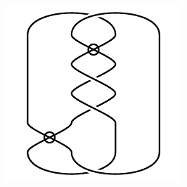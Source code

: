 \begin{figure}[H]
\begin{minipage}[b]{.18\linewidth}
\end{minipage}
\begin{minipage}[b]{.18\linewidth}
\centering
\includegraphics[width=\linewidth]{../data/virtual_4_46.png}
\end{minipage}
\end{figure}

